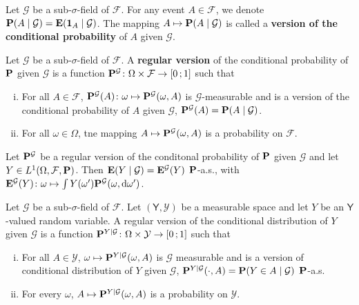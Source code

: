 	\begin{defn}
		Let $\mathcal{G}$ be a sub-$\sigma$-field of $\mathcal{F}$.
		For any event $A \in \mathcal{F}$, we denote $\mathbf{P}(A \mid \mathcal{G}) = \mathbf{E}(\operatorname{\mathbf{1}}_A \mid \mathcal{G})$.
		The mapping $A \mapsto \mathbf{P}(A \mid \mathcal{G})$ is called a \textbf{version of the conditional probability} of $A$ given $\mathcal{G}$.
	\end{defn}

	\begin{defn}
		Let $\mathcal{G}$ be a sub-$\sigma$-field of $\mathcal{F}$.
		A \textbf{regular version} of the conditional probability of $\mathbf{P}$ given $\mathcal{G}$ is a function $\mathbf{P}^{\mathcal{G}} \colon \Omega \times \mathcal{F} \to \mathopen{}\mathclose{\left[0\mathclose{}\mathpunct{};1\right]}$ such that
		\begin{enumerate}[(i)]
			\item For all $A \in \mathcal{F}$, $\mathbf{P}^{\mathcal{G}}(A) \colon \omega \mapsto \mathbf{P}^{\mathcal{G}}(\omega, A)$ is $\mathcal{G}$-measurable and is a version of the conditional probability of $A$ given $\mathcal{G}$, $\mathbf{P}^{\mathcal{G}}(A) = \mathbf{P}(A \mid \mathcal{G})$.
			\item For all $\omega \in \Omega$, tne mapping $A \mapsto \mathbf{P}^{\mathcal{G}}(\omega, A)$ is a probability on $\mathcal{F}$.
		\end{enumerate}
	\end{defn}
	
	\begin{lem}
		Let $\mathbf{P}^{\mathcal{G}}$ be a regular version of the conditonal probability of $\mathbf{P}$ given $\mathcal{G}$ and let $Y \in L^1(\Omega, \mathcal{F}, \mathbf{P})$.
		Then $\mathbf{E}(Y \mid \mathcal{G}) = \mathbf{E}^{\mathcal{G}}(Y)$ $\mathbf{P}$-a.s., with $\mathbf{E}^{\mathcal{G}}(Y) \colon \omega \mapsto \int Y(\omega') \mathbf{P}^{\mathcal{G}}(\omega, \mathop{}\mathopen{}\mathrm{d} \omega')$.
	\end{lem}

	\begin{defn}
		Let $\mathcal{G}$ be a sub-$\sigma$-field of $\mathcal{F}$.
		Let $(\mathsf{Y}, \mathcal{Y})$ be a measurable space and let $Y$ be an $\mathsf{Y}$-valued random variable.
		A regular version of the conditional distribution of $Y$ given $\mathcal{G}$ is a function $\mathbf{P}^{Y \mid \mathcal{G}} \colon \Omega \times \mathcal{Y} \to \mathopen{}\mathclose{\left[0\mathclose{}\mathpunct{};1\right]}$ such that
		\begin{enumerate}[(i)]
			\item For all $A \in \mathcal{Y}$, $\omega \mapsto \mathbf{P}^{Y \mid \mathcal{G}}(\omega, A)$ is $\mathcal{G}$ measurable and is a version of conditional distribution of $Y$ given $\mathcal{G}$, $\mathbf{P}^{Y \mid \mathcal{G}}(\cdot, A) = \mathbf{P}(Y \in A \mid \mathcal{G})$ $\mathbf{P}$-a.s.
			\item For every $\omega$, $A \mapsto \mathbf{P}^{Y \mid \mathcal{G}}(\omega, A)$ is a probability on $\mathcal{Y}$.
		\end{enumerate}
	\end{defn}
